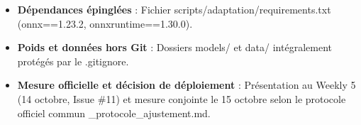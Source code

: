 \documentclass[11pt,a4paper]{article}
\newcommand{\code}[1]  {{\ttfamily #1}}
\begin{document}
\begin{itemize}
\item [x] \textbf{Dépendances épinglées} : Fichier \code{scripts/\allowbreak{}adaptation/\allowbreak{}requirements.\allowbreak{}txt} (\code{onnx==1.\allowbreak{}23.\allowbreak{}2}, \code{onnxruntime==1.\allowbreak{}30.\allowbreak{}0}).
\item [x] \textbf{Poids et données hors Git} : Dossiers \code{models/\allowbreak{}} et \code{data/\allowbreak{}} intégralement protégés par le \code{.\allowbreak{}gitignore}.
\item [ ] \textbf{Mesure officielle et décision de déploiement} : Présentation au Weekly 5 (14 octobre, Issue \#11) et mesure conjointe le 15 octobre selon le protocole officiel commun \code{05\_\allowbreak{}protocole\_\allowbreak{}ajustement.\allowbreak{}md}.
\end{itemize}
\end{document}
